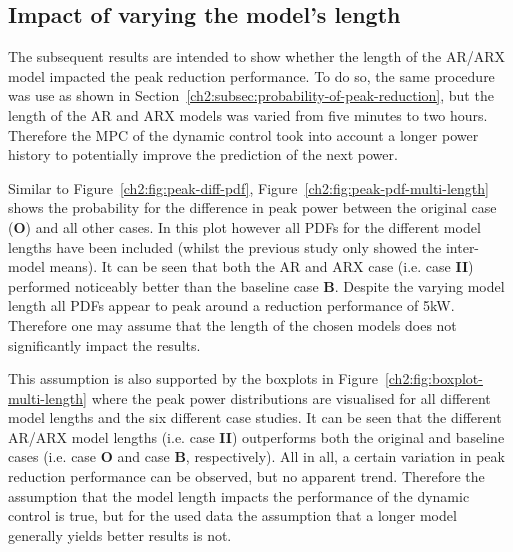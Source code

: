 \subsection{Impact of varying the model's length}

The subsequent results are intended to show whether the length of the AR/ARX model impacted the peak reduction performance.
To do so, the same procedure was use as shown in Section~\ref{ch2:subsec:probability-of-peak-reduction}, but the length of the AR and ARX models was varied from five minutes to two hours.
Therefore the MPC of the dynamic control took into account a longer power history to potentially improve the prediction of the next power.



Similar to Figure~\ref{ch2:fig:peak-diff-pdf}, Figure~\ref{ch2:fig:peak-pdf-multi-length} shows the probability for the difference in peak power between the original case (\textbf{O}) and all other cases.
In this plot however all PDFs for the different model lengths have been included (whilst the previous study only showed the inter-model means).
It can be seen that both the AR and ARX case (i.e. case \textbf{II}) performed noticeably better than the baseline case \textbf{B}.
Despite the varying model length all PDFs appear to peak around a reduction performance of 5kW.
Therefore one may assume that the length of the chosen models does not significantly impact the results.



This assumption is also supported by the boxplots in Figure~\ref{ch2:fig:boxplot-multi-length} where the peak power distributions are visualised for all different model lengths and the six different case studies.
It can be seen that the different AR/ARX model lengths (i.e. case \textbf{II}) outperforms both the original and baseline cases (i.e. case \textbf{O} and case \textbf{B}, respectively).
All in all, a certain variation in peak reduction performance can be observed, but no apparent trend.
Therefore the assumption that the model length impacts the performance of the dynamic control is true, but for the used data the assumption that a longer model generally yields better results is not.

